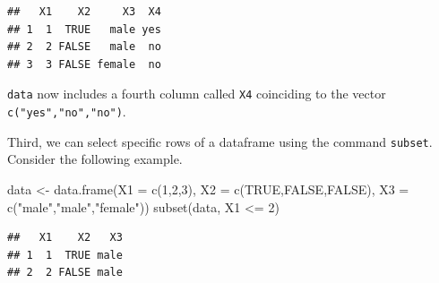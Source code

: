 \documentclass[
]{book}
\newenvironment{Shaded}{\begin{snugshade}}{\end{snugshade}}
\newcommand{\AttributeTok}[1]{\textcolor[rgb]{0.77,0.63,0.00}{#1}}
\newcommand{\ConstantTok}[1]{\textcolor[rgb]{0.00,0.00,0.00}{#1}}
\newcommand{\DecValTok}[1]{\textcolor[rgb]{0.00,0.00,0.81}{#1}}
\newcommand{\FunctionTok}[1]{\textcolor[rgb]{0.00,0.00,0.00}{#1}}
\newcommand{\NormalTok}[1]{#1}
\newcommand{\OtherTok}[1]{\textcolor[rgb]{0.56,0.35,0.01}{#1}}
\newcommand{\SpecialCharTok}[1]{\textcolor[rgb]{0.00,0.00,0.00}{#1}}
\newcommand{\StringTok}[1]{\textcolor[rgb]{0.31,0.60,0.02}{#1}}
\begin{document}
\begin{Shaded}
\end{Shaded}

\begin{verbatim}
##   X1    X2     X3  X4
## 1  1  TRUE   male yes
## 2  2 FALSE   male  no
## 3  3 FALSE female  no
\end{verbatim}

\texttt{data} now includes a fourth column called \texttt{X4} coinciding to the vector \texttt{c("yes","no","no")}.

Third, we can select specific rows of a dataframe using the command \texttt{subset}. Consider the following example.

\begin{Shaded}
\begin{Highlighting}[]
\NormalTok{data }\OtherTok{\textless{}{-}} \FunctionTok{data.frame}\NormalTok{(}\AttributeTok{X1 =} \FunctionTok{c}\NormalTok{(}\DecValTok{1}\NormalTok{,}\DecValTok{2}\NormalTok{,}\DecValTok{3}\NormalTok{), }\AttributeTok{X2 =} \FunctionTok{c}\NormalTok{(}\ConstantTok{TRUE}\NormalTok{,}\ConstantTok{FALSE}\NormalTok{,}\ConstantTok{FALSE}\NormalTok{),}
                   \AttributeTok{X3 =} \FunctionTok{c}\NormalTok{(}\StringTok{"male"}\NormalTok{,}\StringTok{"male"}\NormalTok{,}\StringTok{"female"}\NormalTok{))}
\FunctionTok{subset}\NormalTok{(data, X1 }\SpecialCharTok{\textless{}=} \DecValTok{2}\NormalTok{)}
\end{Highlighting}
\end{Shaded}

\begin{verbatim}
##   X1    X2   X3
## 1  1  TRUE male
## 2  2 FALSE male
\end{verbatim}
\end{document}
